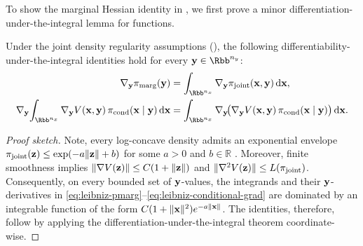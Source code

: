 \documentclass[onefignum,onetabnum]{siamonline250211}
\renewcommand{\d} {{\rm d}}                                %
\newcommand{\bfx}{{\bf x}}
\newcommand{\bfy}{{\bf y}}
\newcommand{\bfz}{{\bf z}}
\newcommand{\bbR}{\mathbb{R}}
\newcommand{\nx}{{n_{x}}}
\newcommand{\ny}{{n_{y}}}
\newcommand{\pjoint}{\pi_{\rm joint}}
\newcommand{\pcond}{\pi_{\rm cond}}
\newcommand{\pmarg}{\pi_{\rm marg}}
\begin{document}
To show the marginal Hessian identity in , we first prove a minor differentiation-under-the-integral lemma for functions.
\begin{lemma}
    \label{lem:leibniz}
    Under the joint density regularity assumptions (), the following differentiability-under-the-integral identities hold for every $\bfy\in\Rbb^\ny$:
    \begin{align}
        \label{eq:leibniz-pmarg}
        \nabla_{\bfy}\pmarg(\bfy)
        &= \int_{\Rbb^\nx}\nabla_{\bfy}\pjoint(\bfx,\bfy)\,\d\bfx, \\
        \label{eq:leibniz-conditional-grad}
        \nabla_{\bfy}\!\int_{\Rbb^\nx}\nabla_{\bfy} V(\bfx,\bfy)\,\pcond(\bfx\mid\bfy)\,\d\bfx
        &= \int_{\Rbb^\nx}\nabla_{\bfy}\!\bigl(\nabla_{\bfy} V(\bfx,\bfy)\,\pcond(\bfx\mid\bfy)\bigr)\,\d\bfx.
    \end{align}
\end{lemma}
\begin{proof}[Proof sketch]
Note, every log-concave density admits an exponential envelope $\pjoint(\bfz)\leq \exp(-a\|\bfz\|+b)$ for some $a>0$ and $b\in\bbR$ \cite[Theorem~5.1]{saumard_log-concavity_2014}.
Moreover, finite smoothness implies $\|\nabla V(\bfz)\|\leq C(1+\|\bfz\|)$ and $\|\nabla^2V(\bfz)\|\leq L(\pjoint)$.
Consequently, on every bounded set of $\bfy$-values, the integrands and their $\bfy$-derivatives in \eqref{eq:leibniz-pmarg}--\eqref{eq:leibniz-conditional-grad} are dominated by an integrable function of the form $C(1+\|\bfx\|^2)e^{-a\|\bfx\|}$.
The identities, therefore, follow by applying the differentiation-under-the-integral theorem \cite[Theorem~2.27]{folland_real_1999} coordinate-wise.
\end{proof}

%
%
%
%
%
%
%
%
%
%
\end{document}
